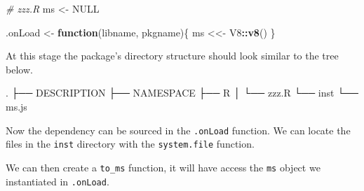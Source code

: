 \documentclass[10pt,]{krantz}
\makeatletter
\newenvironment{Shaded}{\begin{snugshade}}{\end{snugshade}}
\newcommand{\CommentTok}[1]{\textcolor[rgb]{0.37,0.37,0.37}{\textit{#1}}}
\newcommand{\ControlFlowTok}[1]{\textcolor[rgb]{0.27,0.27,0.27}{\textbf{#1}}}
\newcommand{\DataTypeTok}[1]{\textcolor[rgb]{0.27,0.27,0.27}{#1}}
\newcommand{\ExtensionTok}[1]{#1}
\newcommand{\KeywordTok}[1]{\textcolor[rgb]{0.27,0.27,0.27}{\textbf{#1}}}
\newcommand{\NormalTok}[1]{#1}
\newcommand{\OperatorTok}[1]{\textcolor[rgb]{0.43,0.43,0.43}{\textbf{#1}}}
\newcommand{\OtherTok}[1]{\textcolor[rgb]{0.37,0.37,0.37}{#1}}
\newcommand{\StringTok}[1]{\textcolor[rgb]{0.5,0.5,0.5}{#1}}
\newenvironment{kframe}{%
\medskip{}
\setlength{\fboxsep}{.8em}
 \def\at@end@of@kframe{}%
 \ifinner\ifhmode%
  \def\at@end@of@kframe{\end{minipage}}%
  \begin{minipage}{\columnwidth}%
 \fi\fi%
 \def\FrameCommand##1{\hskip\@totalleftmargin \hskip-\fboxsep
 \colorbox{shadecolor}{##1}\hskip-\fboxsep
     \hskip-\linewidth \hskip-\@totalleftmargin \hskip\columnwidth}%
 \MakeFramed {\advance\hsize-\width
   \@totalleftmargin\z@ \linewidth\hsize
   \@setminipage}}%
 {\par\unskip\endMakeFramed%
 \at@end@of@kframe}
\renewenvironment{Shaded}{\begin{kframe}}{\end{kframe}}
\makeatother
\begin{document}
\begin{Shaded}
\begin{Highlighting}[]
\CommentTok{# zzz.R}
\NormalTok{ms <-}\StringTok{ }\OtherTok{NULL}

\NormalTok{.onLoad <-}\StringTok{ }\ControlFlowTok{function}\NormalTok{(libname, pkgname)\{}
\NormalTok{  ms <<-}\StringTok{ }\NormalTok{V8}\OperatorTok{::}\KeywordTok{v8}\NormalTok{()}
\NormalTok{\}}
\end{Highlighting}
\end{Shaded}

At this stage the package's directory structure should look similar to the tree below.

\begin{Shaded}
\begin{Highlighting}[]
\ExtensionTok{.}
\NormalTok{├── }\ExtensionTok{DESCRIPTION}
\NormalTok{├── }\ExtensionTok{NAMESPACE}
\NormalTok{├── }\ExtensionTok{R}
\NormalTok{│   └── }\ExtensionTok{zzz.R}
\NormalTok{└── }\ExtensionTok{inst}
\NormalTok{    └── }\ExtensionTok{ms.js}
\end{Highlighting}
\end{Shaded}

Now the dependency can be sourced in the \texttt{.onLoad} function. We can locate the files in the \texttt{inst} directory with the \texttt{system.file} function.

\begin{Shaded}
\end{Shaded}

We can then create a \texttt{to\_ms} function, it will have access the \texttt{ms} object we instantiated in \texttt{.onLoad}.

\begin{Shaded}
\end{Shaded}
\end{document}
